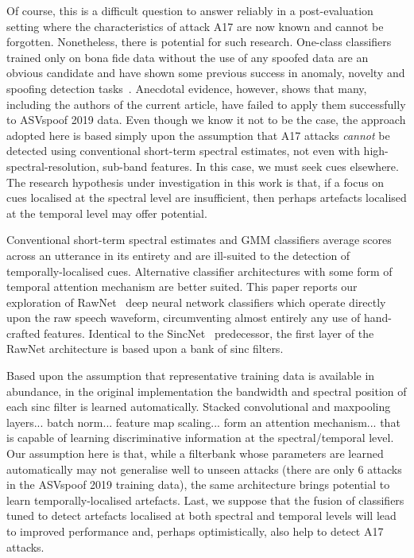 Of course, this is a difficult question to answer reliably in a post-evaluation setting where the characteristics of attack A17 are now known and cannot be forgotten.  Nonetheless, there is potential for such research.  One-class classifiers trained only on bona fide data without the use of any spoofed data are an obvious candidate and have shown some previous success in anomaly, novelty and spoofing detection tasks~\cite{fatemifar2019spoofing,fatemifar2019combining,ohki2019efficient,alegreOneClass}.  Anecdotal evidence, however, shows that many, including the authors of the current article, have failed to apply them successfully to ASVspoof 2019 data.  Even though we know it not to be the case, the approach adopted here is based simply upon the assumption that A17 attacks \emph{cannot} be detected using conventional short-term spectral estimates, not even with high-spectral-resolution, sub-band features.  In this case, we must seek cues elsewhere.  The research hypothesis under investigation in this work is that, if a focus on cues localised at the spectral level are insufficient, then perhaps artefacts localised at the temporal level may offer potential.

Conventional short-term spectral estimates and GMM classifiers average scores across an utterance in its entirety and are ill-suited to the detection of temporally-localised cues.  Alternative classifier architectures with some form of temporal attention mechanism are better suited.  This paper reports our exploration of RawNet~\cite{jung2020improved} deep neural network classifiers which operate directly upon the raw speech waveform, circumventing almost entirely any use of hand-crafted features.  Identical to the SincNet~\cite{ravanelli2018speaker,ravanelli2018learning} predecessor, the first layer of the RawNet architecture is based upon a bank of sinc filters.  

Based upon the assumption that representative training data is available in abundance, in the original implementation the bandwidth and spectral position of each sinc filter is learned automatically.  Stacked convolutional and maxpooling layers... batch norm... feature map scaling... form an attention mechanism... that is capable of learning discriminative information at the spectral/temporal level.  Our assumption here is that, while a filterbank whose parameters are learned automatically may not generalise well to unseen attacks (there are only 6 attacks in the ASVspoof 2019 training data), the same architecture brings potential to learn temporally-localised artefacts.  Last, we suppose that the fusion of classifiers tuned to detect artefacts localised at both spectral and temporal levels will lead to improved performance and, perhaps optimistically, also help to detect A17 attacks.
